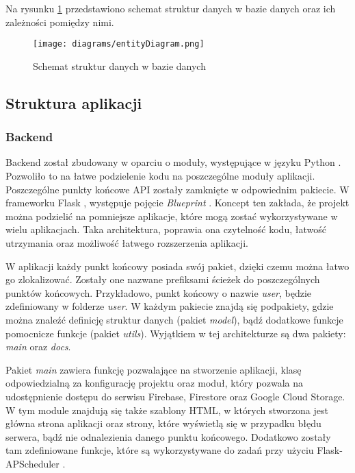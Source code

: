 Na rysunku \ref{database} przedstawiono schemat struktur danych w bazie danych oraz ich zależności pomiędzy nimi.

\begin{figure}[H]
    \centering
    \texttt{[image: diagrams/entityDiagram.png]}
    \caption{Schemat struktur danych w bazie danych}
    \label{database}
\end{figure}

\subsection{Struktura aplikacji}
\subsubsection{Backend}
Backend został zbudowany w oparciu o moduły, występujące w języku Python \cite{python}. Pozwoliło to na łatwe podzielenie kodu na poszczególne moduły aplikacji. Poszczególne punkty końcowe API zostały zamknięte w odpowiednim pakiecie. W frameworku Flask \cite{flask}, występuje pojęcie \textit{Blueprint} \cite{flask_blueprint}. Koncept ten zakłada, że projekt można podzielić na pomniejsze aplikacje, które mogą zostać wykorzystywane w wielu aplikacjach. Taka architektura, poprawia ona czytelność kodu, łatwość utrzymania oraz możliwość łatwego rozszerzenia aplikacji.

W aplikacji każdy punkt końcowy posiada swój pakiet, dzięki czemu można łatwo go zlokalizować. Zostały one nazwane prefiksami ścieżek do poszczególnych punktów końcowych. Przykładowo, punkt końcowy o nazwie \textit{user}, będzie zdefiniowany w folderze \textit{user}. W każdym pakiecie znajdą się podpakiety, gdzie można znaleźć definicję struktur danych (pakiet \textit{model}), bądź dodatkowe funkcje pomocnicze funkcje (pakiet \textit{utils}). Wyjątkiem w tej architekturze są dwa pakiety: \textit{main} oraz \textit{docs}.

Pakiet \textit{main} zawiera funkcję pozwalające na stworzenie aplikacji, klasę odpowiedzialną za konfigurację projektu oraz moduł, który pozwala na udostępnienie dostępu do serwisu Firebase, Firestore oraz Google Cloud Storage. W tym module znajdują się także szablony HTML, w których stworzona jest główna strona aplikacji oraz strony, które wyświetlą się w przypadku błędu serwera, bądź nie odnalezienia danego punktu końcowego. Dodatkowo zostały tam zdefiniowane funkcje, które są wykorzystywane do zadań przy użyciu Flask-APScheduler \cite{flask_apscheduler}.

